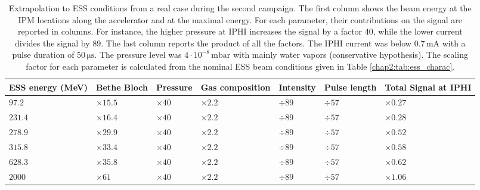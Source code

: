 \begin{table}[ht]
  \centering
  \caption[Extrapolation to ESS conditions from a real case during the second campaign]
  {Extrapolation to ESS conditions from a real case during the second campaign.
    The first column shows the beam energy at the IPM locations along the accelerator and at the maximal energy. For each parameter, their contributions on the signal are reported in columns. For instance, the higher pressure at IPHI increases the signal by a factor $40$, while the lower current divides the signal by $89$. The last column reports the product of all the factors. The IPHI current was below $0.7\,\mathrm{mA}$ with a pulse duration of $50\, \mathrm{\mu s}$. The pressure level was $4 \cdot 10^{-8}\,\mathrm{mbar}$ with mainly water vapors (conservative hypothesis). The scaling factor for each parameter is calculated from the nominal ESS beam conditions given in Table \ref{chap2:tab:ess_charac}.}
  \label{chap4:extrapolationMCP}
  \begin{tabularx}{\linewidth}{XXXXXXX}
    \toprule    ESS energy (MeV) & Bethe Bloch   & Pressure     & Gas composition & Intensity & Pulse length & Total Signal at IPHI \\
    \midrule
    \(97.2\)                     & $\times 15.5$ & $\times 40 $ & $\times 2.2$    & $\div89$  & $\div57$     & $\times 0.27$        \\
    \(231.4\)                    & $\times 16.4$ & $\times 40$  & $\times 2.2$    & $\div89$  & $\div57$     & $\times 0.28$        \\
    \(278.9\)                    & $\times 29.9$ & $\times 40$  & $\times 2.2$    & $\div89$  & $\div57$     & $\times 0.52$        \\
    \(315.8\)                    & $\times 33.4$ & $\times 40$  & $\times 2.2$    & $\div89$  & $\div57$     & $\times 0.58$        \\
    \(628.3\)                    & $\times 35.8$ & $\times 40$  & $\times 2.2$    & $\div89$  & $\div57$     & $\times 0.62$        \\
    \(2000\)                     & $\times 61$   & $\times 40$  & $\times 2.2$    & $\div89$  & $\div57$     & $\times 1.06$        \\
    \bottomrule
  \end{tabularx}
\end{table}
